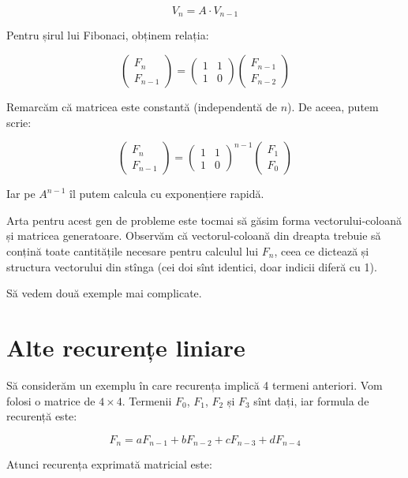 \documentclass[../main.tex]{subfiles}
\begin{document}
$$V_{n} = A \cdot V_{n-1}$$

Pentru șirul lui Fibonaci, obținem relația:

$$
\begin{pmatrix} F_{n} \\ F_{n-1} \end{pmatrix}
=
\begin{pmatrix} 1 & 1 \\ 1 & 0 \end{pmatrix}
\begin{pmatrix} F_{n-1} \\ F_{n-2} \end{pmatrix}
$$

Remarcăm că matricea este constantă (independentă de $n$). De aceea, putem scrie:

$$
\begin{pmatrix} F_{n} \\ F_{n-1} \end{pmatrix}
=
\begin{pmatrix} 1 & 1 \\ 1 & 0 \end{pmatrix}^{n-1}
\begin{pmatrix} F_{1} \\ F_{0} \end{pmatrix}
$$

Iar pe $A^{n-1}$ îl putem calcula cu exponențiere rapidă.

Arta pentru acest gen de probleme este tocmai să găsim forma vectorului-coloană și matricea generatoare. Observăm că vectorul-coloană din dreapta trebuie să conțină toate cantitățile necesare pentru calculul lui $F_n$, ceea ce dictează și structura vectorului din stînga (cei doi sînt identici, doar indicii diferă cu 1).

Să vedem două exemple mai complicate.

\section{Alte recurențe liniare}

Să considerăm un exemplu în care recurența implică 4 termeni anteriori. Vom folosi o matrice de $4 \times 4$. Termenii $F_0$, $F_1$, $F_2$ și $F_3$ sînt dați, iar formula de recurență este:

$$F_{n} = a F_{n - 1} + b F_{n - 2} + c F_{n - 3} + d F_{n-4}$$

Atunci recurența exprimată matricial este:
\end{document}
